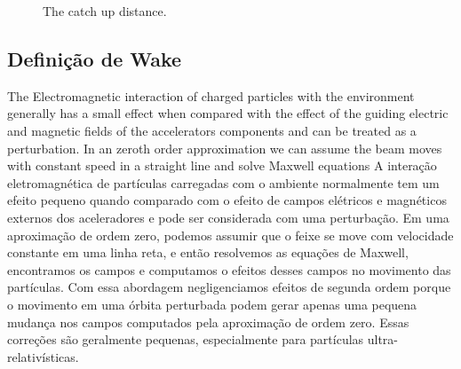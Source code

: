 \begin{figure}[hb!]
\centering
\label{fig:catch_up}
\caption{The catch up distance.}
\end{figure}


\subsection{Definição de Wake}\label{ssec:wake_definition}

The Electromagnetic interaction of charged particles with the environment generally has a small effect when compared with the effect of the guiding electric and magnetic fields of the accelerators components and can be treated as a perturbation. In an zeroth order approximation we can assume the beam moves with constant speed in a straight line and solve Maxwell equations 
A interação eletromagnética de partículas carregadas com o ambiente normalmente tem um efeito pequeno quando comparado com o efeito de campos elétricos e magnéticos externos dos aceleradores e pode ser considerada com uma perturbação. Em uma aproximação de ordem zero, podemos assumir que o feixe se move com velocidade constante em uma linha reta, e então resolvemos as equações de Maxwell, encontramos os campos e computamos o efeitos desses campos no movimento das partículas. Com essa abordagem negligenciamos efeitos de segunda ordem porque o movimento em uma órbita perturbada podem gerar apenas uma pequena mudança nos campos computados pela aproximação de ordem zero. Essas correções são geralmente pequenas, especialmente para partículas ultra-relativísticas.

